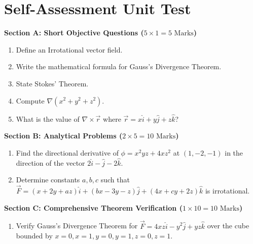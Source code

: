 \section{Self-Assessment Unit Test}

\begin{chaptertest}
\noindent\textbf{Section A: Short Objective Questions ($5 \times 1 = 5\text{ Marks}$)}
\begin{enumerate}[leftmargin=1.5em]
    \item Define an Irrotational vector field.
    \item Write the mathematical formula for Gauss's Divergence Theorem.
    \item State Stokes' Theorem.
    \item Compute $\nabla(x^2+y^2+z^2)$.
    \item What is the value of $\nabla\times\vec{r}$ where $\vec{r} = x\hat{i}+y\hat{j}+z\hat{k}$?
\end{enumerate}

\medskip
\noindent\textbf{Section B: Analytical Problems ($2 \times 5 = 10\text{ Marks}$)}
\begin{enumerate}[leftmargin=1.5em, start=6]
    \item Find the directional derivative of $\phi = x^2 y z + 4 x z^2$ at $(1, -2, -1)$ in the direction of the vector $2\hat{i} - \hat{j} - 2\hat{k}$.
    \item Determine constants $a, b, c$ such that $\vec{F} = (x+2y+az)\hat{i} + (bx-3y-z)\hat{j} + (4x+cy+2z)\hat{k}$ is irrotational.
\end{enumerate}

\medskip
\noindent\textbf{Section C: Comprehensive Theorem Verification ($1 \times 10 = 10\text{ Marks}$)}
\begin{enumerate}[leftmargin=1.5em, start=8]
    \item Verify Gauss's Divergence Theorem for $\vec{F} = 4xz\hat{i} - y^2\hat{j} + yz\hat{k}$ over the cube bounded by $x = 0, x = 1, y = 0, y = 1, z = 0, z = 1$.
\end{enumerate}
\end{chaptertest}

